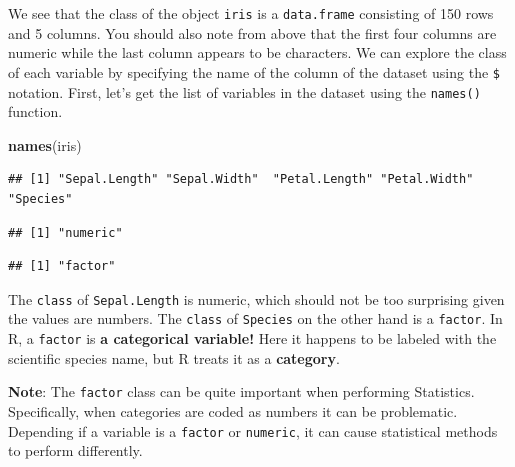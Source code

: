 \documentclass[
]{book}
\newenvironment{Shaded}{\begin{snugshade}}{\end{snugshade}}
\newcommand{\FunctionTok}[1]{\textcolor[rgb]{0.13,0.29,0.53}{\textbf{#1}}}
\newcommand{\NormalTok}[1]{#1}
\newcommand{\SpecialCharTok}[1]{\textcolor[rgb]{0.81,0.36,0.00}{\textbf{#1}}}
\begin{document}
We see that the class of the object \texttt{iris} is a \texttt{data.frame} consisting of 150 rows and 5 columns. You should also note from above that the first four columns are numeric while the last column appears to be characters. We can explore the class of each variable by specifying the name of the column of the dataset using the \texttt{\$} notation. First, let's get the list of variables in the dataset using the \texttt{names()} function.

\begin{Shaded}
\begin{Highlighting}[]
\FunctionTok{names}\NormalTok{(iris)}
\end{Highlighting}
\end{Shaded}

\begin{verbatim}
## [1] "Sepal.Length" "Sepal.Width"  "Petal.Length" "Petal.Width"  "Species"
\end{verbatim}

\begin{Shaded}
\end{Shaded}

\begin{verbatim}
## [1] "numeric"
\end{verbatim}

\begin{Shaded}
\end{Shaded}

\begin{verbatim}
## [1] "factor"
\end{verbatim}

The \texttt{class} of \texttt{Sepal.Length} is numeric, which should not be too surprising given the values are numbers. The \texttt{class} of \texttt{Species} on the other hand is a \texttt{factor}. In R, a \texttt{factor} is \textbf{a categorical variable!} Here it happens to be labeled with the scientific species name, but R treats it as a \textbf{category}.

\textbf{Note}: The \texttt{factor} class can be quite important when performing Statistics. Specifically, when categories are coded as numbers it can be problematic. Depending if a variable is a \texttt{factor} or \texttt{numeric}, it can cause statistical methods to perform differently.
\end{document}
